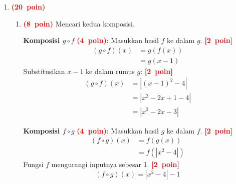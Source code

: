 \documentclass[12pt,a4paper]{article}
\newcommand{\bobot}[1]{\mbox{\textcolor{red}{\textbf{(#1 poin)}}}}
\newcommand{\poin}[1]{\mbox{\textcolor{red}{\textbf{[#1 poin]}}}}
\begin{document}
\begin{enumerate}
        Karena garis yang dicari tegak lurus, maka perkalian gradiennya adalah $-1$. \poin{6}
        \begin{align*}
          m_1 \cdot m_2            = -1                             \implies
          -\frac{3}{10} \cdot m_2 = -1 \implies m_2 = \frac{10}{3}
        \end{align*}
        Persamaan garis yang melalui titik $(x_1, y_1) = (8, 2)$ dengan gradien $m_2 = \frac{10}{3}$: \poin{6}
        \begin{align*}
          y - y_1 & = m_2(x - x_1)        \\
          y - 2   & = \frac{10}{3}(x - 8)
        \end{align*}
        Sederhanakan untuk memperoleh persamaan garis akhirnya: \poin{4}
        \begin{align*}
          3(y - 2)      & = 10(x - 8) \\
          3y - 6        & = 10x - 80  \\
          10x - 3y - 74 & = 0
        \end{align*}

  \item \bobot{20}
        \begin{enumerate}[label=\alph*.]
          \item \bobot{8} Mencari kedua komposisi.

                \textbf{Komposisi $g \circ f$} \bobot{4}:
                Masukkan hasil $f$ ke dalam $g$. \poin{2}
                \begin{align*}
                  (g \circ f)(x) & = g(f(x))  \\
                                 & = g(x - 1)
                \end{align*}
                Substitusikan $x-1$ ke dalam rumus $g$: \poin{2}
                \begin{align*}
                  (g \circ f)(x) & = |(x - 1)^2 - 4|    \\
                                 & = |x^2 - 2x + 1 - 4| \\
                                 & = |x^2 - 2x - 3|
                \end{align*}

                \textbf{Komposisi $f \circ g$} \bobot{4}:
                Masukkan hasil $g$ ke dalam $f$. \poin{2}
                \begin{align*}
                  (f \circ g)(x) & = f(g(x))    \\
                                 & = f(|x^2-4|)
                \end{align*}
                Fungsi $f$ mengurangi inputnya sebesar 1. \poin{2}
                \[ (f \circ g)(x)=|x^2-4|-1 \]


\end{enumerate}
\end{enumerate}
\end{document}
